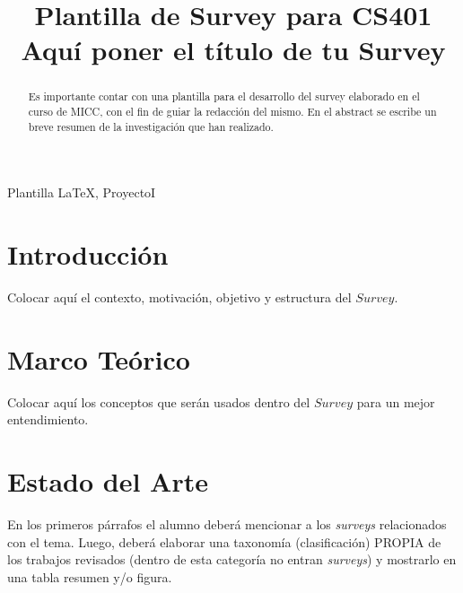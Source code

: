 \documentclass[conference]{IEEEtran}
\begin{document}
\title{Plantilla de Survey para CS401 \\
Aquí poner el título de tu Survey } 


\author{
\and
{}
}



\maketitle

\begin{abstract}
Es importante contar con una plantilla para el desarrollo del survey elaborado en el curso de MICC, con el fin de guiar la redacción del mismo. 
En el abstract se escribe un breve resumen de la investigación que han realizado.
\end{abstract}


\begin{IEEEkeywords} Plantilla \LaTeX, ProyectoI \end{IEEEkeywords}

\IEEEpeerreviewmaketitle

\section{Introducción}

Colocar aquí el contexto, motivación, objetivo y estructura del $Survey$.


\section{Marco Teórico}
Colocar aquí los conceptos que serán usados dentro del $Survey$ para un mejor entendimiento.


\section{Estado del Arte}
En los primeros párrafos el alumno deberá mencionar a los \textit{surveys} relacionados con el tema.
Luego, deberá elaborar una taxonomía (clasificación) PROPIA de los trabajos revisados (dentro de esta categoría no entran \textit{surveys}) y mostrarlo en una tabla resumen y/o figura. 
\end{document}
